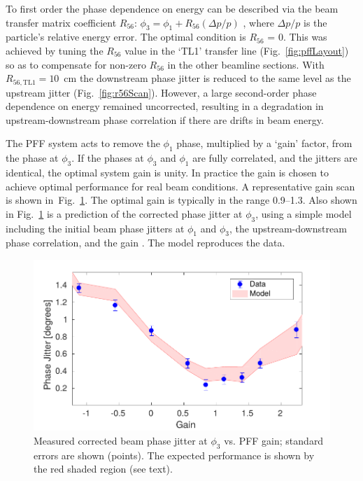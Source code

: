 \documentclass[%
 reprint,
 superscriptaddress,
 amsmath,
 amssymb,
 prl,
]{revtex4-1}
\begin{document}
To first order the phase dependence on energy can be described via the beam 
transfer matrix coefficient 
\(R_{56}\): \(\phi_3 = \phi_1 + R_{56}(\Delta p / p)\)
, where \(\Delta p / p\) is the particle's relative energy error.
The optimal condition is \(R_{56}\) = 0.
This was achieved by tuning the \(R_{56}\) value in the `TL1' transfer line 
(Fig.~\ref{fig:pffLayout}) so as to compensate for non-zero \(R_{56}\) in the 
other beamline sections. With \(R_{56, \mathrm{TL1}}=10\)~cm the 
downstream phase jitter is reduced to the same level as the upstream jitter 
(Fig.~\ref{fig:r56Scan}). 
However, a large second-order phase dependence on energy remained uncorrected, 
resulting in a degradation in upstream-downstream phase correlation if there 
are drifts in beam energy.

The PFF system acts to remove the \(\phi_1\) phase, multiplied by a `gain' 
factor, from the phase at \(\phi_3\). If the phases at \(\phi_3\) and 
\(\phi_1\) are fully correlated, and the jitters are identical, the optimal 
system gain is unity.
In practice the gain is chosen to achieve optimal 
performance for real beam conditions. A representative gain scan is shown 
in~Fig.~\ref{fig:gScan}. The optimal gain is typically in the range 
0.9--1.3. Also shown in Fig.~\ref{fig:gScan} is a prediction of 
the corrected phase jitter at \(\phi_3\), using a simple model including the 
initial beam phase jitters at \(\phi_1\) and 
\(\phi_3\), the upstream-downstream phase correlation, and the gain 
\cite{RobertsThesis}. The model reproduces the data.

\begin{figure}
\includegraphics[width=\columnwidth]{fig5}
\caption{\label{fig:gScan}Measured corrected beam  phase jitter at \(\phi_3\) 
vs. PFF gain; standard errors are shown (points). The expected 
performance is shown by the red shaded region (see text).}
\end{figure}
\end{document}
